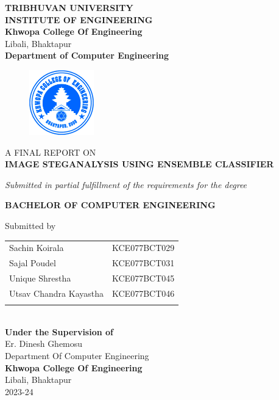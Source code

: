 	\begin{center}
		\thispagestyle{empty}
		\Large\textbf{TRIBHUVAN UNIVERSITY}\\
		\Large\textbf{INSTITUTE OF ENGINEERING }\\
		\vspace{0.2in}
		\large{\textbf{Khwopa College Of Engineering}\\}
		\normalsize{Libali, Bhaktapur\\}
		\large\textbf{Department of Computer Engineering}
		\vspace{0.2in}
		\begin{figure}[h]
		    \centering
			    \includegraphics[width=0.25\textwidth]{img/Khwopalogo.jpg}
		\end{figure}
		
		\vspace{0.2in}
		\large{A FINAL REPORT ON\\\textbf{IMAGE STEGANALYSIS USING ENSEMBLE CLASSIFIER}\\}
		
		\vspace{0.2in}
		\large{\textit{Submitted in partial fulfillment of the requirements for the degree\\}}
		
		\vspace{0.2in}
		\large{\textbf{BACHELOR OF COMPUTER ENGINEERING}\\}
		
		\vspace{0.2in}
		\large{Submitted by}\\
		\begin{tabular}{p{3.5in}p{3in}}
			\hspace{0.3cm}Sachin Koirala & KCE077BCT029\\
			\hspace{0.3cm}Sajal Poudel & KCE077BCT031\\
			\hspace{0.3cm}Unique Shrestha & KCE077BCT045\\
			\hspace{0.3cm}Utsav Chandra Kayastha &KCE077BCT046\\
		 \vspace{0.2in}
		\end{tabular}
		\\
		\vspace{1cm}
		\large{\textbf{Under the Supervision of}\\}
			\normalsize{Er. Dinesh Ghemosu\\
				Department Of Computer Engineering\\
			}
			\vspace{2cm}
		\large{\textbf{Khwopa College Of Engineering}\\}
			\normalsize{Libali, Bhaktapur\\
			2023-24
		}
	\end{center}
